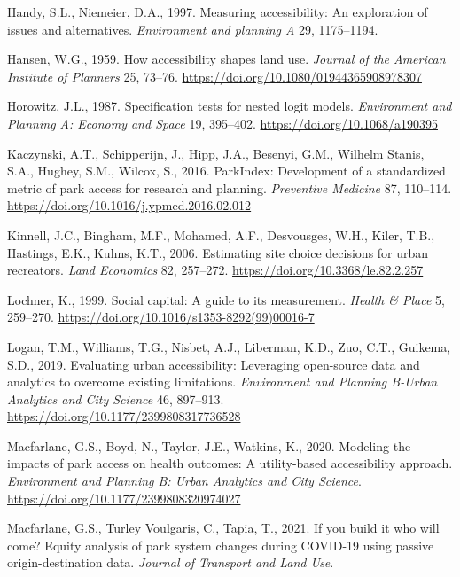 \documentclass[3p, authoryear, review]{elsarticle} %
\newlength{\cslhangindent}
\newenvironment{CSLReferences}[2] %
 {%
  \setlength{\parindent}{0pt}
  \ifodd #1 \everypar{\setlength{\hangindent}{\cslhangindent}}\ignorespaces\fi
  \ifnum #2 > 0
  \setlength{\parskip}{#2\baselineskip}
  \fi
 }%
 {}
\begin{document}
\begin{CSLReferences}{1}{0}
\leavevmode{}%
Handy, S.L., Niemeier, D.A., 1997. Measuring accessibility: An exploration of issues and alternatives. \emph{Environment and planning A} 29, 1175--1194.

\leavevmode{}%
Hansen, W.G., 1959. How accessibility shapes land use. \emph{Journal of the American Institute of Planners} 25, 73--76. \url{https://doi.org/10.1080/01944365908978307}

\leavevmode{}%
Horowitz, J.L., 1987. Specification tests for nested logit models. \emph{Environment and Planning A: Economy and Space} 19, 395--402. \url{https://doi.org/10.1068/a190395}

\leavevmode{}%
Kaczynski, A.T., Schipperijn, J., Hipp, J.A., Besenyi, G.M., Wilhelm Stanis, S.A., Hughey, S.M., Wilcox, S., 2016. ParkIndex: Development of a standardized metric of park access for research and planning. \emph{Preventive Medicine} 87, 110--114. \url{https://doi.org/10.1016/j.ypmed.2016.02.012}

\leavevmode{}%
Kinnell, J.C., Bingham, M.F., Mohamed, A.F., Desvousges, W.H., Kiler, T.B., Hastings, E.K., Kuhns, K.T., 2006. Estimating site choice decisions for urban recreators. \emph{Land Economics} 82, 257--272. \url{https://doi.org/10.3368/le.82.2.257}

\leavevmode{}%
Lochner, K., 1999. Social capital: A guide to its measurement. \emph{Health \& Place} 5, 259--270. \url{https://doi.org/10.1016/s1353-8292(99)00016-7}

\leavevmode{}%
Logan, T.M., Williams, T.G., Nisbet, A.J., Liberman, K.D., Zuo, C.T., Guikema, S.D., 2019. Evaluating urban accessibility: Leveraging open-source data and analytics to overcome existing limitations. \emph{Environment and Planning B-Urban Analytics and City Science} 46, 897--913. \url{https://doi.org/10.1177/2399808317736528}

\leavevmode{}%
Macfarlane, G.S., Boyd, N., Taylor, J.E., Watkins, K., 2020. Modeling the impacts of park access on health outcomes: A utility-based accessibility approach. \emph{Environment and Planning B: Urban Analytics and City Science}. \url{https://doi.org/10.1177/2399808320974027}

\leavevmode{}%
Macfarlane, G.S., Turley Voulgaris, C., Tapia, T., 2021. If you build it who will come? Equity analysis of park system changes during COVID-19 using passive origin-destination data. \emph{Journal of Transport and Land Use}.


\end{CSLReferences}
\end{document}
